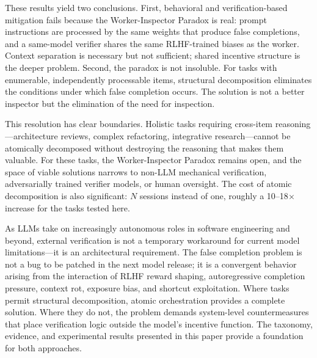 These results yield two conclusions.
First, behavioral and verification-based mitigation fails because the Worker-Inspector Paradox is real: prompt instructions are processed by the same weights that produce false completions, and a same-model verifier shares the same RLHF-trained biases as the worker.
Context separation is necessary but not sufficient; shared incentive structure is the deeper problem.
Second, the paradox is not insoluble.
For tasks with enumerable, independently processable items, structural decomposition eliminates the conditions under which false completion occurs.
The solution is not a better inspector but the elimination of the need for inspection.

This resolution has clear boundaries.
Holistic tasks requiring cross-item reasoning---architecture reviews, complex refactoring, integrative research---cannot be atomically decomposed without destroying the reasoning that makes them valuable.
For these tasks, the Worker-Inspector Paradox remains open, and the space of viable solutions narrows to non-LLM mechanical verification, adversarially trained verifier models, or human oversight.
The cost of atomic decomposition is also significant: $N$ sessions instead of one, roughly a 10--18$\times$ increase for the tasks tested here.

As LLMs take on increasingly autonomous roles in software engineering and beyond, external verification is not a temporary workaround for current model limitations---it is an architectural requirement.
The false completion problem is not a bug to be patched in the next model release; it is a convergent behavior arising from the interaction of RLHF reward shaping, autoregressive completion pressure, context rot, exposure bias, and shortcut exploitation.
Where tasks permit structural decomposition, atomic orchestration provides a complete solution.
Where they do not, the problem demands system-level countermeasures that place verification logic outside the model's incentive function.
The taxonomy, evidence, and experimental results presented in this paper provide a foundation for both approaches.
